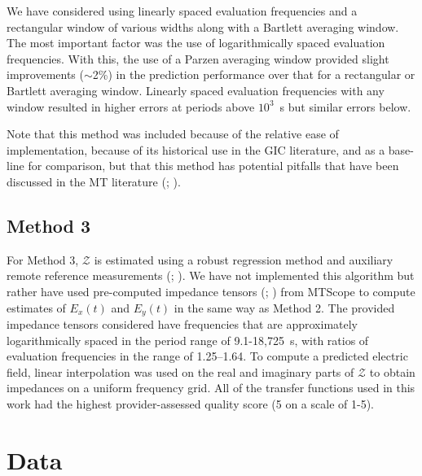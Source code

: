 \documentclass[12pt]{article}
\begin{document}
We have considered using linearly spaced evaluation frequencies and a rectangular window of various widths along with a Bartlett averaging window.  The most important factor was the use of logarithmically spaced evaluation frequencies.  With this, the use of a Parzen averaging window provided slight improvements ($\sim$2\%) in the prediction performance over that for a rectangular or Bartlett averaging window.  Linearly spaced evaluation frequencies with any window resulted in higher errors at periods above $10^3$~s but similar errors below.  

Note that this method was included because of the relative ease of implementation, because of its historical use in the GIC literature, and as a base-line for comparison, but that this method has potential pitfalls that have been discussed in the MT literature (\cite{Egbert1986}; \cite{Eisel2001}).

\subsection{Method 3}

For Method 3, $\mathcal{Z}$ is estimated using a robust regression method and auxiliary remote reference measurements (\cite{Egbert1986}; \cite{Eisel2001}).  We have not implemented this algorithm but rather have used pre-computed impedance tensors (\cite{Kelbert2011}; \cite{Schultz2016}) from MTScope to compute estimates of $E_x(t)$ and $E_y(t)$ in the same way as Method 2.  The provided impedance tensors considered have frequencies that are approximately logarithmically spaced in the period range of 9.1-18,725~s, with ratios of evaluation frequencies in the range of 1.25--1.64.  To compute a predicted electric field, linear interpolation was used on the real and imaginary parts of $\mathcal{Z}$ to obtain impedances on a uniform frequency grid.  All of the transfer functions used in this work had the highest provider-assessed quality score (5 on a scale of 1-5).

\section{Data}
\end{document}
